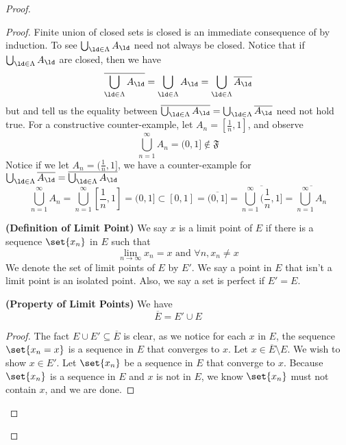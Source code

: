 \documentclass{report}
\begin{document}
\begin{proof}
\begin{proof}
Finite union of closed sets is closed is an immediate consequence of  by induction. To see $\bigcup_{\ld \in \Lambda }A_\ld $ need not always be closed. Notice that if $\bigcup _{\ld \in\Lambda }A_\ld$ are closed, then we have
 \begin{equation*}
   \overline{\bigcup_{\ld \in \Lambda }A_\ld}=\bigcup_{\ld \in\Lambda }A_\ld=\bigcup_{\ld \in\Lambda }\overline{A_\ld }
\end{equation*}
but  and  tell us the equality between $\overline{\bigcup_{\ld \in\Lambda }A_\ld }=\bigcup_{\ld \in \Lambda }\overline{A_\ld }$ need not hold true. For a constructive counter-example, let $A_n=[\frac{1}{n},1]$, and observe
\begin{equation*}
  \bigcup_{n=1}^\infty A_n=(0,1]\not\in \mathfrak{F}
\end{equation*}
Notice if we let $A_n=(\frac{1}{n},1]$, we have a counter-example for $\bigcup_{\ld \in \Lambda }\overline{A_\ld }=\overline{\bigcup _{\ld \in\Lambda }A_\ld }$
\begin{equation*}
  \bigcup_{n=1}^\infty A_n=\bigcup_{n=1}^\infty [\frac{1}{n},1]=(0,1]\subset [0,1]=\overline{(0,1]}=\overline{\bigcup_{n=1}^\infty(\frac{1}{n},1]}=\overline{\bigcup _{n=1}^\infty A_n}
\end{equation*}
\begin{definition}
\label{3.2.6}
\textbf{(Definition of Limit Point)} We say $x$ is a limit point of  $E$ if there is a sequence $\set{x_n}$ in $E$ such that
\begin{equation*}
\lim_{n\to\infty} x_n=x\text{ and }\forall n, x_n\neq x
\end{equation*}
We denote the set of limit points of $E$ by  $E'$. We say a point in $E$ that isn't a limit point is an isolated point. Also, we say a set is perfect if $E'=E$. 
\end{definition}
\begin{theorem}
\label{3.2.7}
\textbf{(Property of Limit Points)} We have
\begin{equation*}
\overline{E}=E'\cup E
\end{equation*}
\end{theorem}
\begin{proof}
The fact $E\cup E'\subseteq \overline{E}$ is clear, as we notice for each $x$ in $E$, the sequence $\set{x_n=x}$ is a sequence in $E$ that converges to $x$. Let $x\in \overline{E}\setminus E$. We wish to show $x\in E'$. Let $\set{x_n}$ be a sequence in $E$ that converge to  $x$. Because $\set{x_n}$ is a sequence in $E$ and $x$ is not in $E$, we know  $\set{x_n}$ must not contain $x$, and we are done.

\end{proof}
\end{proof}
\end{proof}
\end{document}
